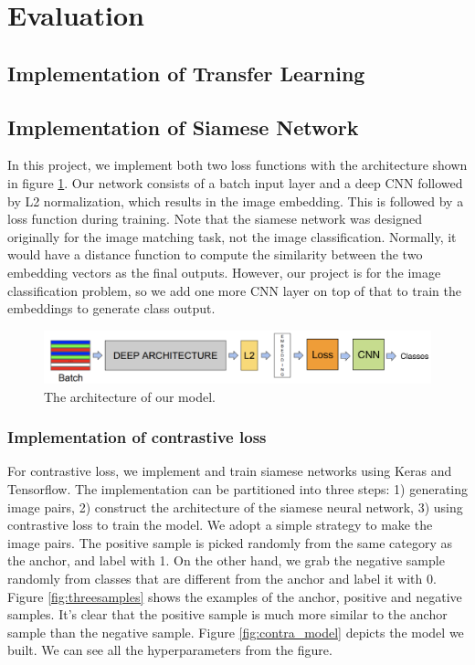 \section{Evaluation}

\subsection{Implementation of Transfer Learning}

\subsection{Implementation of Siamese Network}

In this project, we implement both two loss functions with the architecture shown in figure \ref{fig:model}. Our network consists of a batch input layer and a deep CNN followed by L2 normalization, which results in the image embedding. This is followed by a loss function during training. Note that the siamese network was designed originally for the image matching task, not the image classification. Normally, it would have a distance function to compute the similarity between the two embedding vectors as the final outputs. However, our project is for the image classification problem, so we add one more CNN layer on top of that to train the embeddings to generate class output.

\begin{figure}[h]
  \centering
  \includegraphics[width=\linewidth]{figs/model.png}
  \caption{The architecture of our model.}
  \label{fig:model}
\end{figure}

\subsubsection{Implementation of contrastive loss}
For contrastive loss, we implement and train siamese networks using Keras and Tensorflow. The implementation can be partitioned into three steps: 1) generating image pairs, 2) construct the architecture of the siamese neural network, 3) using contrastive loss to train the model. We adopt a simple strategy to make the image pairs. The positive sample is picked randomly from the same category as the anchor, and label with 1. On the other hand, we grab the negative sample randomly from classes that are different from the anchor and label it with 0. Figure \ref{fig:threesamples} shows the examples of the anchor, positive and negative samples. It's clear that the positive sample is much more similar to the anchor sample than the negative sample. Figure \ref{fig:contra_model} depicts the model we built. We can see all the hyperparameters from the figure. 

